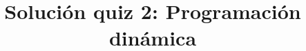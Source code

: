 \documentclass{doc}
\title{Solución quiz 2: Programación dinámica}
\begin{document}
\makedocheader
\soluciontrue

\end{document}
